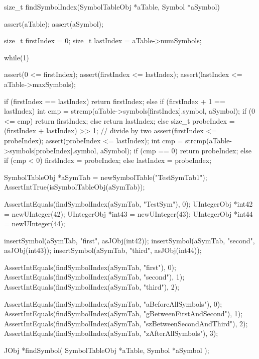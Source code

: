\startCCode
size_t findSymbolIndex(SymbolTableObj *aTable,  Symbol *aSymbol) {
  assert(aTable);
  assert(aSymbol);
  
  size_t firstIndex = 0;
  size_t lastIndex  = aTable->numSymbols;
  
  while(1) {
    assert(0 <= firstIndex);
    assert(firstIndex <= lastIndex);
    assert(lastIndex  <= aTable->maxSymbols);
    
    if (firstIndex == lastIndex) {
      return firstIndex;
    } else if (firstIndex + 1 == lastIndex) {
      int cmp = strcmp(aTable->symbols[firstIndex].symbol, aSymbol);
      if (0 <= cmp) {
        return firstIndex;
      } else {
        return lastIndex;
      }
    } else {
      size_t probeIndex = (firstIndex + lastIndex) >> 1; // divide by two
      assert(firstIndex <= probeIndex);
      assert(probeIndex <= lastIndex);
      int cmp = strcmp(aTable->symbols[probeIndex].symbol, aSymbol);
      if (cmp == 0) {
        return probeIndex;
      } else if (cmp < 0) {
        firstIndex = probeIndex;
      } else {
        lastIndex = probeIndex;
      }
    }
  }  
}
\stopCCode


\startCTest
  SymbolTableObj *aSymTab = newSymbolTable("TestSymTab1");
  AssertIntTrue(isSymbolTableObj(aSymTab));
  
  AssertIntEquals(findSymbolIndex(aSymTab, "TestSym"), 0);
  UIntegerObj *int42 = newUInteger(42);
  UIntegerObj *int43 = newUInteger(43);
  UIntegerObj *int44 = newUInteger(44);
  
  insertSymbol(aSymTab, "first",  asJObj(int42));
  insertSymbol(aSymTab, "second", asJObj(int43));
  insertSymbol(aSymTab, "third",  asJObj(int44));
  
  AssertIntEquals(findSymbolIndex(aSymTab, "first"),  0);
  AssertIntEquals(findSymbolIndex(aSymTab, "second"), 1);
  AssertIntEquals(findSymbolIndex(aSymTab, "third"),  2);
  
  AssertIntEquals(findSymbolIndex(aSymTab, "aBeforeAllSymbols"),       0);
  AssertIntEquals(findSymbolIndex(aSymTab, "gBetweenFirstAndSecond"),  1);
  AssertIntEquals(findSymbolIndex(aSymTab, "szBetweenSecondAndThird"), 2);
  AssertIntEquals(findSymbolIndex(aSymTab, "zAfterAllSymbols"),        3);
\stopCTest
\stopTestCase
\stopTestSuite

\startTestSuite[findSymbol]

\startCHeader
JObj *findSymbol(
  SymbolTableObj *aTable,
  Symbol         *aSymbol
);
\stopCHeader

